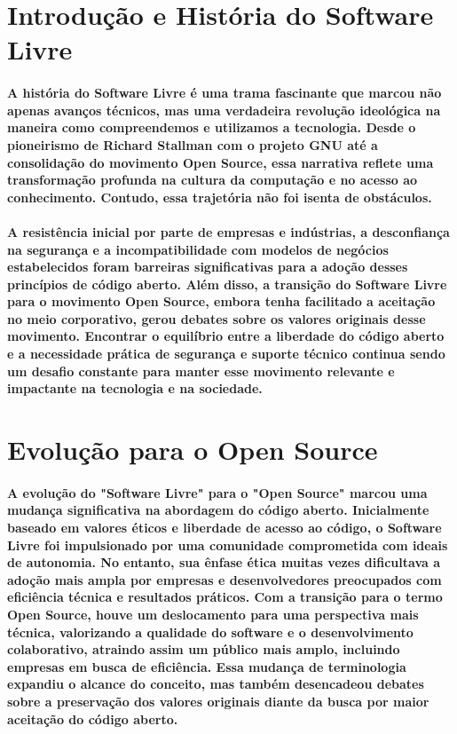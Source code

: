 \documentclass[a4paper, 12pt]{article}
\begin{document}
\newpage

\section{Introdução e História do Software Livre} 
\paragraph{A história do Software Livre é uma trama fascinante que marcou não apenas avanços técnicos, mas uma verdadeira revolução ideológica na maneira como compreendemos e utilizamos a tecnologia. Desde o pioneirismo de Richard Stallman com o projeto GNU até a consolidação do movimento Open Source, essa narrativa reflete uma transformação profunda na cultura da computação e no acesso ao conhecimento. Contudo, essa trajetória não foi isenta de obstáculos.}
\paragraph{A resistência inicial por parte de empresas e indústrias, a desconfiança na segurança e a incompatibilidade com modelos de negócios estabelecidos foram barreiras significativas para a adoção desses princípios de código aberto. Além disso, a transição do Software Livre para o movimento Open Source, embora tenha facilitado a aceitação no meio corporativo, gerou debates sobre os valores originais desse movimento. Encontrar o equilíbrio entre a liberdade do código aberto e a necessidade prática de segurança e suporte técnico continua sendo um desafio constante para manter esse movimento relevante e impactante na tecnologia e na sociedade.}

\section{Evolução para o Open Source}
\paragraph{A evolução do "Software Livre" para o "Open Source" marcou uma mudança significativa na abordagem do código aberto. Inicialmente baseado em valores éticos e liberdade de acesso ao código, o Software Livre foi impulsionado por uma comunidade comprometida com ideais de autonomia. No entanto, sua ênfase ética muitas vezes dificultava a adoção mais ampla por empresas e desenvolvedores preocupados com eficiência técnica e resultados práticos. Com a transição para o termo Open Source, houve um deslocamento para uma perspectiva mais técnica, valorizando a qualidade do software e o desenvolvimento colaborativo, atraindo assim um público mais amplo, incluindo empresas em busca de eficiência. Essa mudança de terminologia expandiu o alcance do conceito, mas também desencadeou debates sobre a preservação dos valores originais diante da busca por maior aceitação do código aberto.}
\end{document}
